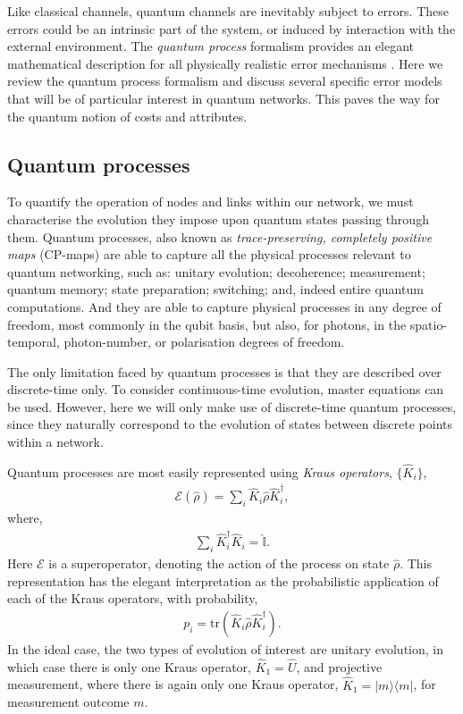 \documentclass[aps,rmp,twocolumn,amsmath,amssymb,nofootinbib,superscriptaddress,longbibliography,floatfix]{revtex4-1}
\newcommand{\bra}[1]{\langle#1|}
\newcommand{\ket}[1]{|#1\rangle}
\begin{document}
Like classical channels, quantum channels are inevitably subject to errors. These errors could be an intrinsic part of the system, or induced by interaction with the external environment. The \emph{quantum process} formalism provides an elegant mathematical description for all physically realistic error mechanisms \cite{bib:NielsenChuang00, bib:Gilchrist05}. Here we review the quantum process formalism and discuss several specific error models that will be of particular interest in quantum networks. This paves the way for the quantum notion of costs and attributes.

%
%

\subsection{Quantum processes}

To quantify the operation of nodes and links within our network, we must characterise the evolution they impose upon quantum states passing through them. Quantum processes, also known as \emph{trace-preserving, completely positive maps} (CP-maps) are able to capture all the physical processes relevant to quantum networking, such as: unitary evolution; decoherence; measurement; quantum memory; state preparation; switching; and, indeed entire quantum computations. And they are able to capture physical processes in any degree of freedom, most commonly in the qubit basis, but also, for photons, in the spatio-temporal, photon-number, or polarisation degrees of freedom.

The only limitation faced by quantum processes is that they are described over discrete-time only. To consider continuous-time evolution, master equations can be used. However, here we will only make use of discrete-time quantum processes, since they naturally correspond to the evolution of states between discrete points within a network.

Quantum processes are most easily represented using \emph{Kraus operators}, $\{\hat{K}_i\}$,
\begin{align}
\mathcal{E}(\hat\rho) = \sum_i \hat{K}_i \hat\rho \hat{K}_i^\dag,
\end{align}
where,
\begin{align}
\sum_i \hat{K}_i^\dag \hat{K}_i = \hat{\mathbb{I}}.
\end{align}
Here $\mathcal{E}$ is a superoperator, denoting the action of the process on state $\hat\rho$. This representation has the elegant interpretation as the probabilistic application of each of the Kraus operators, with probability,
\begin{align}
p_i = \mathrm{tr}(\hat{K}_i \hat\rho \hat{K}_i^\dag).
\end{align}
In the ideal case, the two types of evolution of interest are unitary evolution, in which case there is only one Kraus operator, \mbox{$\hat{K}_1=\hat{U}$}, and projective measurement, where there is again only one Kraus operator, \mbox{$\hat{K}_1=\ket{m}\bra{m}$}, for measurement outcome $m$.
\end{document}
